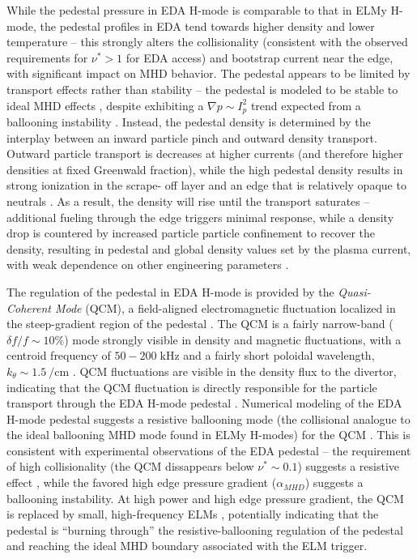 While the pedestal pressure in EDA H-mode is comparable to that in ELMy H-mode, the pedestal profiles in EDA tend towards higher density and lower temperature -- this strongly alters the collisionality (consistent with the observed requirements for $\nu^* > 1$ for EDA access) and bootstrap current near the edge, with significant impact on MHD behavior.  The pedestal appears to be limited by transport effects rather than stability -- the pedestal is modeled to be stable to ideal MHD effects \cite{Mossessian2002,Hughes2013}, despite exhibiting a $\nabla p \sim I_p^2$ trend expected from a ballooning instability \cite{Hughes2006}.  Instead, the pedestal density is determined by the interplay between an inward particle pinch and outward density transport.  Outward particle transport is decreases at higher currents (and therefore higher densities at fixed Greenwald fraction), while the high pedestal density results in strong ionization in the scrape-
off layer and an edge that is relatively opaque to neutrals \cite{Hubbard2007,Greenwald2007}.  As a result, the density will rise until the transport saturates -- additional fueling through the edge triggers minimal response, while a density drop is countered by increased particle particle confinement to recover the density, resulting in pedestal and global density values set by the plasma current, with weak dependence on other engineering parameters \cite{Hughes2007}.

The regulation of the pedestal in EDA H-mode is provided by the \emph{Quasi-Coherent Mode} (QCM), a field-aligned electromagnetic fluctuation localized in the steep-gradient region of the pedestal \cite{Hubbard2001,Terry2005,Mossessian2003}.  The QCM is a fairly narrow-band ($\delta f/f \sim 10\%$) mode strongly visible in density and magnetic fluctuations, with a centroid frequency of $50-200\;\si{\kilo\hertz}$ and a fairly short poloidal wavelength, $k_\theta \sim \SI{1.5}{\per\centi\meter}$ \cite{Terry2005}.  QCM fluctuations are visible in the density flux to the divertor, indicating that the QCM fluctuation is directly responsible for the particle transport through the EDA H-mode pedestal \cite{Greenwald2007,Terry2005}.  Numerical modeling of the EDA H-mode pedestal suggests a resistive ballooning mode (the collisional analogue to the ideal ballooning MHD mode found in ELMy H-modes) for the QCM \cite{Mazurenko2002,Hughes2007a}.  This is consistent with experimental 
observations of the EDA pedestal -- the requirement of high collisionality (the QCM dissappears below $\nu^* \sim 0.1$) suggests a resistive effect \cite{Hughes2013}, while the favored high edge pressure gradient ($\alpha_{MHD}$) suggests a ballooning instability.  At high power and high edge pressure gradient, the QCM is replaced by small, high-frequency ELMs \cite{Mossessian2002,Mossessian2003,Hughes2007a}, potentially indicating that the pedestal is ``burning through'' the resistive-ballooning regulation of the pedestal and reaching the ideal MHD boundary associated with the ELM trigger.

